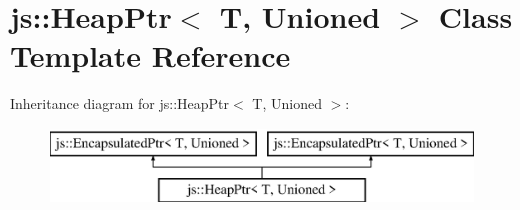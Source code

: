\hypertarget{classjs_1_1_heap_ptr}{\section{js\-:\-:Heap\-Ptr$<$ T, Unioned $>$ Class Template Reference}
\label{classjs_1_1_heap_ptr}
}
Inheritance diagram for js\-:\-:Heap\-Ptr$<$ T, Unioned $>$\-:\begin{figure}[H]
\begin{center}
\leavevmode
\includegraphics[height=2.000000cm]{classjs_1_1_heap_ptr}
\end{center}
\end{figure}
